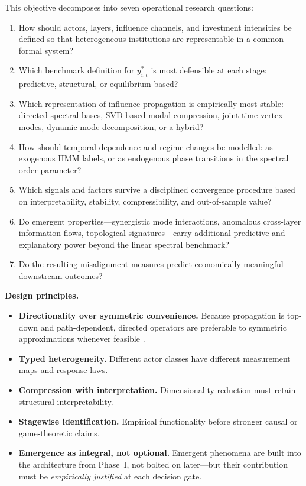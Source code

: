 \documentclass[11pt,a4paper]{article}
\theoremstyle{definition}
\begin{document}
This objective decomposes into seven operational research questions:
\begin{enumerate}[nosep]
  \item How should actors, layers, influence channels, and investment intensities be defined so that heterogeneous institutions are representable in a common formal system?
  \item Which benchmark definition for $y^*_{i,t}$ is most defensible at each stage: predictive, structural, or equilibrium-based?
  \item Which representation of influence propagation is empirically most stable: directed spectral bases, SVD-based modal compression, joint time-vertex modes, dynamic mode decomposition, or a hybrid?
  \item How should temporal dependence and regime changes be modelled: as exogenous HMM labels, or as endogenous phase transitions in the spectral order parameter?
  \item Which signals and factors survive a disciplined convergence procedure based on interpretability, stability, compressibility, and out-of-sample value?
  \item Do emergent properties---synergistic mode interactions, anomalous cross-layer information flows, topological signatures---carry additional predictive and explanatory power beyond the linear spectral benchmark?
  \item Do the resulting misalignment measures predict economically meaningful downstream outcomes?
\end{enumerate}

\textbf{Design principles.}
\begin{itemize}[nosep]
  \item \textbf{Directionality over symmetric convenience.} Because propagation is top-down and path-dependent, directed operators are preferable to symmetric approximations whenever feasible \citep{marques2020signal}.
  \item \textbf{Typed heterogeneity.} Different actor classes have different measurement maps and response laws.
  \item \textbf{Compression with interpretation.} Dimensionality reduction must retain structural interpretability.
  \item \textbf{Stagewise identification.} Empirical functionality before stronger causal or game-theoretic claims.
  \item \textbf{Emergence as integral, not optional.} Emergent phenomena are built into the architecture from Phase~I, not bolted on later---but their contribution must be \emph{empirically justified} at each decision gate.
\end{itemize}
\end{document}
